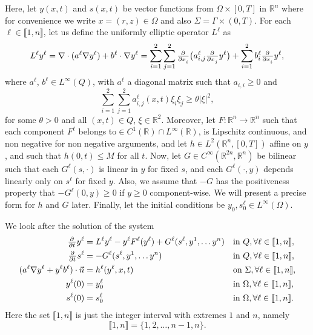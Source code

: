 \documentclass[11pt]{article}
\newcommand{\R}{\mathbb{R}}
\newcommand{\llb}{\llbracket}
\newcommand{\rrb}{\rrbracket}
\begin{document}
Here, let \(y(x,t)\) and \(s(x,t)\) be vector functions from \(\Omega \times [0,T]\) in \(\R^{n}\) where for convenience we write \( x = (r,z) \in \Omega\) and also \(\Sigma = \Gamma \times (0,T)\). For each \(\ell \in \llb1,n\rrb\), let us define the uniformly elliptic operator \(L^\ell\) as
\[
	L^\ell y^\ell = \nabla \cdot (a^\ell \nabla y^\ell) + b^\ell \cdot \nabla y^\ell
	= \sum_{i=1}^{2}  \sum_{j=1}^2 \pd{ }{x_i} \big( a_{i,j}^\ell \pd{ }{x_j} y^\ell \big) + \sum_{i=1}^2 b_i^\ell \pd{ }{x_i} y^\ell,
\]
where \(a^\ell\), \(b^\ell \in L^\infty (Q)\), with \(a^\ell\) a diagonal matrix such that \(a_{i,i} \geq 0\) and
\[
	\sum_{i=1}^{2}  \sum_{j=1}^2 a_{i,j}^\ell (x,t) \xi_i \xi_j \geq \theta |\xi|^2,
\]
for some \(\theta > 0\) and all \((x,t) \in Q\), \( \xi \in \R^2\).
%
Moreover, let \(F: \R^n \to \R^n\) such that each component \( F^\ell \) belongs to\( \in C^1 (\R) \cap L^\infty (\R)\), is Lipschitz continuous, and non negative for non negative arguments, and let \(h\in L^2 (\R^n,[0,T]) \) affine on \(y\), and such that \(h(0,t) \leq M \) for all \(t\).
Now, let \(G \in C^\infty(\R^{2n}, \R^n)\) be bilinear such that each \( G^\ell(s,\cdot)\) is linear in \( y\) for fixed \(s\), and each \( G^\ell (\cdot, y)\) depends linearly only on \( s^\ell\) for fixed \(y\). Also, we assume that \(-G\) has the positiveness property that \(-G^\ell (0, y) \geq 0\) if \( y\geq 0\) component-wise. We will present a precise form for \(h\) and \(G\) later.
Finally, let the initial conditions be \( y_0, s_0^\ell \in L^\infty (\Omega)\).

We look after the solution of the system
\begin{subequations}
\label{eq:pde-ode-sys-a}
\begin{align}
	\pd{ }{t} y^\ell &= L^\ell y^\ell - y^\ell F^\ell(y^\ell) + G^\ell(s^\ell,y^1,\ldots y^n) 		&& \text{in } Q, \forall \ell \in \llb 1,n\rrb,
	\\
	\label{sys:coupled-ode}
	\pd{ }{t} s^\ell &= -G^\ell(s^\ell,y^1,\ldots y^n)				&& \text{in } Q,\forall \ell \in \llb 1,n\rrb,
	\\
	 (a^\ell \nabla y^\ell + y^\ell b^\ell) \cdot \vec{n} &= h^\ell (y^\ell, x,t)	&& \text{on } \Sigma,\forall \ell \in \llb 1,n\rrb,
	 \label{eq:1.2.d}
	 \\
	 y^\ell(0) &= y^\ell_{0}			 && \text{in } \Omega, \forall \ell \in \llb 1,n\rrb,
	 \\
	 s^\ell(0) &= s^\ell_{0}			 && \text{in } \Omega, \forall \ell \in \llb 1,n\rrb.
\end{align}
\end{subequations}
Here the set \( \llb 1,n\rrb\) is just the integer interval with extremes \(1\) and \(n\), namely
\[
	\llb 1,n\rrb = \{1,2,\ldots, n-1, n\}.
\]
\end{document}
